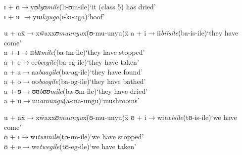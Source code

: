 \begin{exe}
\begin{tabbing}
		ɪ + ʊ\>$\rightarrow$\>yʊ\>\textit{lyʊmile}\>(\degree lɪ-ʊm-ile)\>`it (class 5) has dried'\\
		ɪ + u \>$\rightarrow$\>yu\>\textit{ɪkyuga}\>(\degree ɪ-kɪ-uga)\>`hoof'
	\end{tabbing}
	\ex
	\begin{tabbing}
		u + ax\=$\rightarrow$x\=waxx\=\textit{ʊmuunyu}x\=(\degree ʊ-mu-unyu)x\=\kill%
		a + i\>$\rightarrow$\>ii\>\textit{biisile}\>(\degree ba-is-ile)\>`they have come'\\
		a + ɪ\>$\rightarrow$\>ɪɪ\>\textit{bɪɪmile}\>(\degree ba-ɪm-ile)\>`they have stopped'\\
		a + e\>$\rightarrow$\>ee\>\textit{beegile}\>(\degree ba-eg-ile)\>`they have taken'\\
		a + a\>$\rightarrow$\>aa\>\textit{baagile}\>(\degree ba-ag-ile)\>`they have found'\\
		a + o\>$\rightarrow$\>oo\>\textit{boogile}\>(\degree ba-og-ile)\>`they have bathed'\\
		a + ʊ\>$\rightarrow$\>ʊʊ\>\textit{bʊʊmile}\>(\degree ba-ʊm-ile)\>`they have dried'\\
		a + u\>$\rightarrow$\>uu\>\textit{amungu}\>(\degree a-ma-ungu)\>`mushrooms'
	\end{tabbing}
	\ex
	\begin{tabbing}
		u + ax\=$\rightarrow$x\=waxx\=\textit{ʊmuunyu}x\=(\degree ʊ-mu-unyu)x\=\kill%
		ʊ + i\>$\rightarrow$\>wi\>\textit{twisile}\>(\degree tʊ-is-ile)\>`we have come'\\
		ʊ + ɪ\>$\rightarrow$\>wɪ\>\textit{twɪmile}\>(\degree tʊ-ɪm-ile)\>`we have stopped'\\
		ʊ + e\>$\rightarrow$\>we\>\textit{twegile}\>(\degree tʊ-eg-ile)\>`we have taken'\\

\end{tabbing}
\end{exe}
